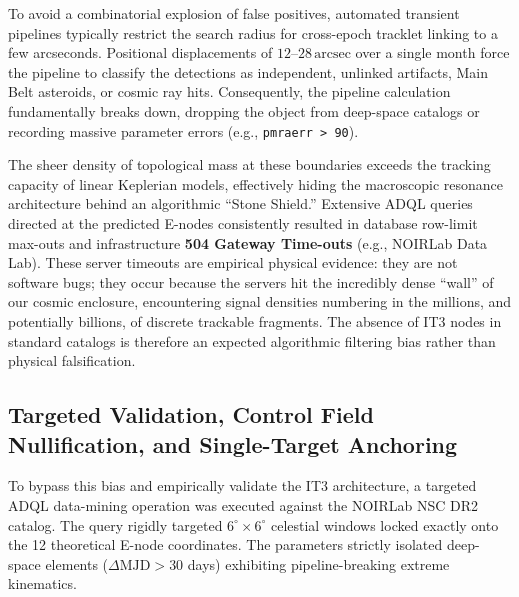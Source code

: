 \documentclass[11pt,a4paper]{article}
\theoremstyle{remark}
\newcommand{\arcsec}{\,\mathrm{arcsec}}
\begin{document}
To avoid a combinatorial explosion of false positives, automated transient pipelines typically restrict the search radius for cross-epoch tracklet linking to a few arcseconds. Positional displacements of $12$--$28 \arcsec$ over a single month force the pipeline to classify the detections as independent, unlinked artifacts, Main Belt asteroids, or cosmic ray hits. Consequently, the pipeline calculation fundamentally breaks down, dropping the object from deep-space catalogs or recording massive parameter errors (e.g., \texttt{pmraerr > 90}). 

The sheer density of topological mass at these boundaries exceeds the tracking capacity of linear Keplerian models, effectively hiding the macroscopic resonance architecture behind an algorithmic ``Stone Shield.'' Extensive ADQL queries directed at the predicted E-nodes consistently resulted in database row-limit max-outs and infrastructure \textbf{504 Gateway Time-outs} (e.g., NOIRLab Data Lab). These server timeouts are empirical physical evidence: they are not software bugs; they occur because the servers hit the incredibly dense ``wall'' of our cosmic enclosure, encountering signal densities numbering in the millions, and potentially billions, of discrete trackable fragments. The absence of IT3 nodes in standard catalogs is therefore an expected algorithmic filtering bias rather than physical falsification.

\subsection{Targeted Validation, Control Field Nullification, and Single-Target Anchoring}

To bypass this bias and empirically validate the IT3 architecture, a targeted ADQL data-mining operation was executed against the NOIRLab NSC DR2 catalog. The query rigidly targeted $6^\circ \times 6^\circ$ celestial windows locked exactly onto the 12 theoretical E-node coordinates. The parameters strictly isolated deep-space elements ($\Delta \text{MJD} > 30$ days) exhibiting pipeline-breaking extreme kinematics.
\end{document}
